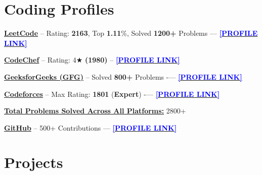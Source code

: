 \section{Coding Profiles}

\begin{onecolentry}
    \textbf{\underline{LeetCode}} – Rating: \textbf{2163}, Top \textbf{1.11}\%, Solved \textbf{1200+} Problems — 
    \href{https://leetcode.com/u/AlgoXJishan/}{\textbf{\textcolor{blue}{[PROFILE LINK]}}}
\end{onecolentry}

\begin{onecolentry}
\textbf{\underline{CodeChef}} -- Rating: 4$\bigstar$ \textbf{(1980)} --
\href{https://www.codechef.com/users/wilders_frost}{\textbf{\textcolor{blue}{[PROFILE LINK]}}}
\end{onecolentry}

\begin{onecolentry}
    \textbf{\underline{GeeksforGeeks (GFG)}} – Solved \textbf{800+} Problems -— 
    \href{https://www.geeksforgeeks.org/user/skjishan25j94/}{\textbf{\textcolor{blue}{[PROFILE LINK]}}}
\end{onecolentry}

\begin{onecolentry}
 \textbf{\underline{Codeforces}} – Max Rating: \textbf{1801} (\textbf{Expert}) -— 
    \href{https://codeforces.com/profile/Wolf_fiesta}{\textbf{\textcolor{blue}{[PROFILE LINK]}}}
\end{onecolentry}

\begin{onecolentry}
    \textbf{\underline{Total Problems Solved Across All Platforms:}} 2800+
\end{onecolentry}

\begin{onecolentry}
    \textbf{\underline{GitHub}} – 500+ Contributions — 
    \href{https://github.com/SkJishan04}{\textbf{\textcolor{blue}{[PROFILE LINK]}}}
\end{onecolentry}

\section{Projects}

